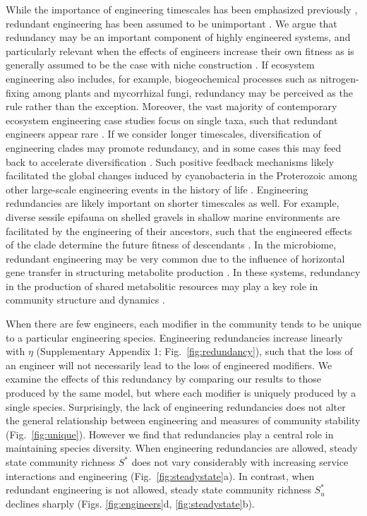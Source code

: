 \documentclass[twocolumn,preprintnumbers,amsmath,amssymb,superscriptaddress,linenumbers]{revtex4-1}
\begin{document}
While the importance of engineering timescales has been emphasized previously \cite{Hastings2007}, redundant engineering has been assumed to be unimportant \cite{Lawton1994}.
We argue that redundancy may be an important component of highly engineered systems, and particularly relevant when the effects of engineers increase their own fitness \cite{Cuddington2004} as is generally assumed to be the case with niche construction \cite{Krakauer2009}.
If ecosystem engineering also includes, for example, biogeochemical processes such as nitrogen-fixing among plants and mycorrhizal fungi, redundancy may be perceived as the rule rather than the exception.
Moreover, the vast majority of contemporary ecosystem engineering case studies focus on single taxa, such that redundant engineers appear rare \cite{Lawton1994}.
If we consider longer timescales, diversification of engineering clades may promote redundancy, and in some cases this may feed back to accelerate diversification \cite{OdlingSmee2013b}.
Such positive feedback mechanisms likely facilitated the global changes induced by cyanobacteria in the Proterozoic \cite{Erwin2008,Schirrmeister2013} among other large-scale engineering events in the history of life \cite{Erwin2008}.
Engineering redundancies are likely important on shorter timescales as well.
For example, diverse sessile epifauna on shelled gravels in shallow marine environments are facilitated by the engineering of their ancestors, such that the engineered effects of the clade determine the future fitness of descendants \cite{Kidwell1986}.
In the microbiome, redundant engineering may be very common due to the influence of horizontal gene transfer in structuring metabolite production \cite{Polz2013}.
In these systems, redundancy in the production of shared metabolitic resources may play a key role in community structure and dynamics \cite{Kallus2017,Butler2018}.




When there are few engineers, each modifier in the community tends to be unique to a particular engineering species.
Engineering redundancies increase linearly with $\eta$ (Supplementary Appendix 1; Fig.\ \ref{fig:redundancy}), such that the loss of an engineer will not necessarily lead to the loss of engineered modifiers. %
We examine the effects of this redundancy by comparing our results to those produced by the same model, but where each modifier is uniquely produced by a single species.
Surprisingly, the lack of engineering redundancies does not alter the general relationship between engineering and measures of community stability (Fig.\ \ref{fig:unique}).
However we find that redundancies play a central role in maintaining species diversity.
When engineering redundancies are allowed, steady state community richness $S^*$ does not vary considerably with increasing service interactions and engineering (Fig.\ \ref{fig:steadystate}a).
In contrast, when redundant engineering is not allowed, steady state community richness $S^*_u$ declines sharply (Figs. \ref{fig:engineers}d, \ref{fig:steadystate}b).
\end{document}
